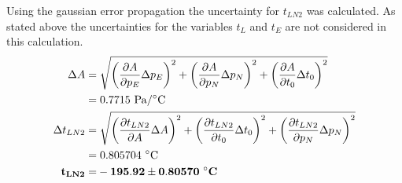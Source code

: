     Using the gaussian error propagation the uncertainty for $t_{LN2}$ was calculated. As stated above
    the uncertainties for the variables $t_L$ and $t_E$ are not considered in this calculation. %
    \begin{align}
        \Delta A =& \; \sqrt{ \left(\frac{\partial A}{\partial p_E} \Delta p_E \right)^2 +
                            \left(\frac{\partial A}{\partial p_N} \Delta p_N \right)^2 +
                            \left(\frac{\partial A}{\partial t_0} \Delta t_0 \right)^2 }\\
        =& \; 0.7715~\si{\pascal/\celsius}\\
        \Delta t_{LN2} =& \; \sqrt{ \left(\frac{\partial t_{LN2}}{\partial A} \Delta A \right)^2 +
                                    \left(\frac{\partial t_{LN2}}{\partial t_0} \Delta t_0 \right)^2 +
                                    \left(\frac{\partial t_{LN2}}{\partial p_N} \Delta p_N \right)^2 }\\
        =& \; 0.805704~\si{\celsius}\\
        \bf t_{LN2} =& \bf -195.92 \pm 0.80570 ~\si{\bf\celsius} \label{res_tN}
    \end{align}






